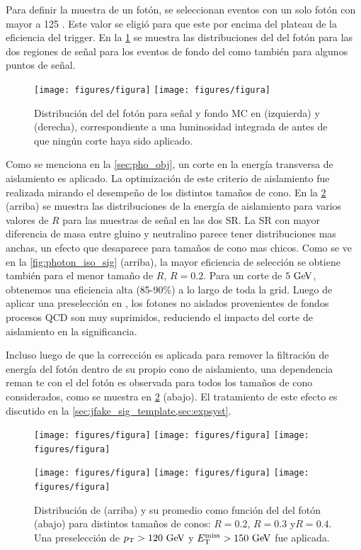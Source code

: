 Para definir la muestra de un fotón, se seleccionan eventos con un solo
fotón con {\pt} mayor a 125 \gev. Este valor se eligió para que este por
encima del plateau de la eficiencia del trigger. En la \cref{fig:photon_pt}
se muestra las distribuciones del {\pt} del fotón para las dos regiones
de señal para los eventos de fondo del {\SM} como también para algunos puntos
de señal.

\begin{figure}[bh!]
  \centering
  \texttt{[image: figures/figura]} %
  \texttt{[image: figures/figura]} %
  \caption{Distribución del {\pt} del fotón para señal y fondo MC en {\SRL} (izquierda) y
    {\SRH} (derecha), correspondiente a una luminosidad integrada de {\ilumi} antes de que ningún
    corte haya sido aplicado. }
  \label{fig:photon_pt}
\end{figure}

Como se menciona en la \cref{sec:pho_obj}, un corte en la energía transversa
de aislamiento es aplicado.
La optimización de este criterio de aislamiento  fue realizada mirando el desempe\~no
de los distintos tamaños de cono. En la \cref{fig:photon_iso} (arriba)
se muestra las distribuciones de la energía de aislamiento para varios valores de $R$ para
las muestras de señal en las dos SR. La SR con mayor diferencia de masa entre
gluino y neutralino parece tener distribuciones mas anchas, un efecto que desaparece
para tamaños de cono mas chicos. Como se ve en la \cref{fig:photon_iso_sig} (arriba),
la mayor eficiencia de selección se obtiene también para el menor tamaño de $R$, $R = 0.2$.
Para un corte de $5 \GeV$, obtenemos una eficiencia alta (85-90\%) a lo largo de toda la grid.
Luego de aplicar una preselección en {\met}, los fotones no aislados provenientes de fondos
procesos QCD son muy suprimidos, reduciendo el impacto del corte de aislamiento en la
significancia.

Incluso luego de que la corrección es aplicada para remover la filtración
de energía del fotón dentro de su propio cono de aislamiento, una dependencia
reman te con el {\pt} del fotón es observada para todos los tamaños de cono
considerados, como se muestra en \cref{fig:photon_iso} (abajo).
El tratamiento de este efecto es discutido en la \cref{sec:jfake_sig_template,sec:expsyst}.


\begin{figure}[th!]
 \centering
 \texttt{[image: figures/figura]} %
 \texttt{[image: figures/figura]} %
 \texttt{[image: figures/figura]} %

 \texttt{[image: figures/figura]} %
 \texttt{[image: figures/figura]} %
 \texttt{[image: figures/figura]} %

 \caption{Distribución de {\etiso} (arriba) y su promedio como función del
   {\pt} del fotón (abajo) para distintos tamaños de conos: $R=0.2$, $R=0.3$ y$R=0.4$.
   Una preselección de $\pt>120\gev$ y $\met>150\gev$ fue aplicada.}
 \label{fig:photon_iso}
\end{figure}


